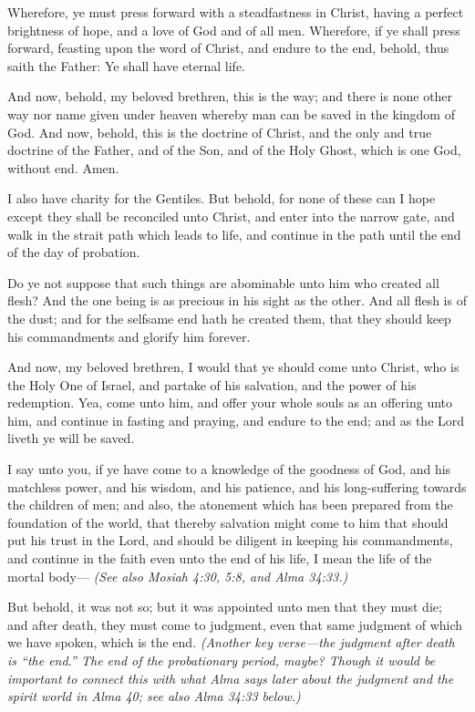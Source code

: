 \begin{compactdesc}
			\item[2 Nephi 31:20] Wherefore, ye must press forward with a steadfastness in Christ, having a perfect brightness of hope, and a love of God and of all men. Wherefore, if ye shall press forward, feasting upon the word of Christ, and endure to the end, behold, thus saith the Father: Ye shall have eternal life.
			\item[2 Nephi 31:21] And now, behold, my beloved brethren, this is the way; and there is none other way nor name given under heaven whereby man can be saved in the kingdom of God. And now, behold, this is the doctrine of Christ, and the only and true doctrine of the Father, and of the Son, and of the Holy Ghost, which is one God, without end. Amen.
			\item[2 Nephi 33:9] I also have charity for the Gentiles. But behold, for none of these can I hope except they shall be reconciled unto Christ, and enter into the narrow gate, and walk in the strait path which leads to life, and continue in the path until the end of the day of probation.
			\item[Jacob 2:21] Do ye not suppose that such things are abominable unto him who created all flesh? And the one being is as precious in his sight as the other. And all flesh is of the dust; and for the selfsame end hath he created them, that they should keep his commandments and glorify him forever.
			\item[Omni 1:26] And now, my beloved brethren, I would that ye should come unto Christ, who is the Holy One of Israel, and partake of his salvation, and the power of his redemption.  Yea, come unto him, and offer your whole souls as an offering unto him, and continue in fasting and praying, and endure to the end; and as the Lord liveth ye will be saved.
			\item[Mosiah 4:6] I say unto you, if ye have come to a knowledge of the goodness of God, and his matchless power, and his wisdom, and his patience, and his long-suffering towards the children of men; and also, the atonement which has been prepared from the foundation of the world, that thereby salvation might come to him that should put his trust in the Lord, and should be diligent in keeping his commandments, and continue in the faith even unto the end of his life, I mean the life of the mortal body--- \textit{(See also Mosiah 4:30, 5:8, and Alma 34:33.)}
			\item[Alma 12:27] But behold, it was not so; but it was appointed unto men that they must die; and after death, they must come to judgment, even that same judgment of which we have spoken, which is the end. \textit{(Another key verse---the judgment after death is ``the end.'' The end of the probationary period, maybe? Though it would be important to connect this with what Alma says later about the judgment and the spirit world in Alma 40; see also Alma 34:33 below.)}

\end{compactdesc}
